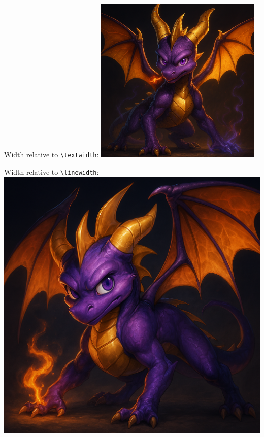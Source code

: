 \documentclass[twocolumn]{article}
\begin{document}
\lipsum[1]

Width relative to \texttt{\textbackslash textwidth}:
\includegraphics[width=0.6\textwidth]{example-image-a.png}

Width relative to \texttt{\textbackslash linewidth}:
\includegraphics[width=0.8\linewidth]{example-image-c.png}

\lipsum[2-5]
\end{document}
